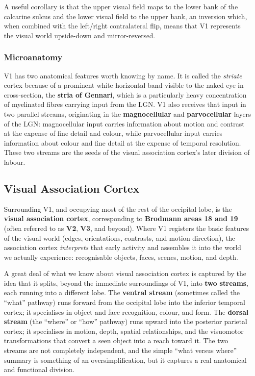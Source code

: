 \documentclass[11pt]{article}
\begin{document}
A useful corollary is that the upper visual field maps to the lower bank of the calcarine sulcus and the lower visual field to the upper bank, an inversion which, when combined with the left/right contralateral flip, means that V1 represents the visual world upside-down and mirror-reversed.

\subsubsection{Microanatomy}

V1 has two anatomical features worth knowing by name. It is called the \textit{striate} cortex because of a prominent white horizontal band visible to the naked eye in cross-section, the \textbf{stria of Gennari}, which is a particularly heavy concentration of myelinated fibres carrying input from the LGN. V1 also receives that input in two parallel streams, originating in the \textbf{magnocellular} and \textbf{parvocellular} layers of the LGN: magnocellular input carries information about motion and contrast at the expense of fine detail and colour, while parvocellular input carries information about colour and fine detail at the expense of temporal resolution. These two streams are the seeds of the visual association cortex's later division of labour.

\subsection{Visual Association Cortex}

Surrounding V1, and occupying most of the rest of the occipital lobe, is the \textbf{visual association cortex}, corresponding to \textbf{Brodmann areas 18 and 19} (often referred to as \textbf{V2}, \textbf{V3}, and beyond). Where V1 registers the basic features of the visual world (edges, orientations, contrasts, and motion direction), the association cortex \textit{interprets} that early activity and assembles it into the world we actually experience: recognisable objects, faces, scenes, motion, and depth.

A great deal of what we know about visual association cortex is captured by the idea that it splits, beyond the immediate surroundings of V1, into \textbf{two streams}, each running into a different lobe. The \textbf{ventral stream} (sometimes called the ``what'' pathway) runs forward from the occipital lobe into the inferior temporal cortex; it specialises in object and face recognition, colour, and form. The \textbf{dorsal stream} (the ``where'' or ``how'' pathway) runs upward into the posterior parietal cortex; it specialises in motion, depth, spatial relationships, and the visuomotor transformations that convert a seen object into a reach toward it. The two streams are not completely independent, and the simple ``what versus where'' summary is something of an oversimplification, but it captures a real anatomical and functional division.
\end{document}
